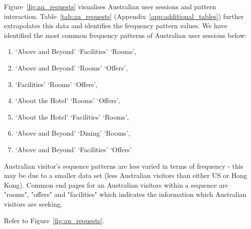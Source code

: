Figure~\ref{fig:au_requests} visualises Australian user sessions and pattern interaction. Table~\ref{tab:au_requests}  (Appendix~\ref{app:additional_tables}) further extrapolates this data and identifies the frequency pattern values. We have identified the most common frequency patterns of Australian user sessions below:

\begin{enumerate}
  \item `Above and Beyond' \ra{} `Facilities' \ra{} `Rooms',
  \item `Above and Beyond' \ra{} `Rooms' \ra{} `Offers',
  \item `Facilities' \ra{} `Rooms' \ra{} `Offers',
  \item `About the Hotel' \ra{} `Rooms' \ra{} `Offers',
  \item `About the Hotel' \ra{} `Facilities' \ra{} `Rooms',
  \item `Above and Beyond' \ra{} `Dining' \ra{} `Rooms',
  \item `Above and Beyond' \ra{} `Facilities' \ra{} `Offers'
\end{enumerate}


Australian visitor's sequence patterns are less varied in terms of frequency - this may be due to a smaller data set (less Australian visitors than either US or Hong Kong). Common end pages for an Australian visitors within a sequence are "rooms", "offers" and "facilities" which indicates the information which Australian visitors are seeking.

Refer to Figure~\ref{fig:au_requests}.

\newpage
\begin{landscape}
\pagestyle{empty}
\end{landscape}